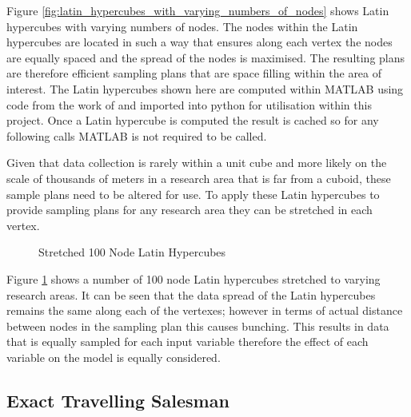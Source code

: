\documentclass[a4paper,12pt,twoside]{article}
\begin{document}
Figure \ref{fig:latin_hypercubes_with_varying_numbers_of_nodes} shows Latin hypercubes with varying numbers of nodes. The nodes within the Latin hypercubes are located in such a way that ensures along each vertex the nodes are equally spaced and the spread of the nodes is maximised. The resulting plans are therefore efficient sampling plans that are space filling within the area of interest. The Latin hypercubes shown here are computed within MATLAB using code from the work of  and imported into python for utilisation within this project. Once a Latin hypercube is computed the result is cached so for any following calls MATLAB is not required to be called.

Given that data collection is rarely within a unit cube and more likely on the scale of thousands of meters in a research area that is far from a cuboid, these sample plans need to be altered for use. To apply these Latin hypercubes to provide sampling plans for any research area they can be stretched in each vertex.

\begin{figure}
	\centering
	
	\caption{Stretched 100 Node Latin Hypercubes}
	\label{fig:stretched_100_node_latin_hypercubes}
\end{figure}

Figure \ref{fig:stretched_100_node_latin_hypercubes} shows a number of 100 node Latin hypercubes stretched to varying research areas. It can be seen that the data spread of the Latin hypercubes remains the same along each of the vertexes; however in terms of actual distance between nodes in the sampling plan this causes bunching. This results in data that is equally sampled for each input variable therefore the effect of each variable on the model is equally considered.

\subsection{Exact Travelling Salesman}
\label{sec:exact_travelling_salesman}
\end{document}
